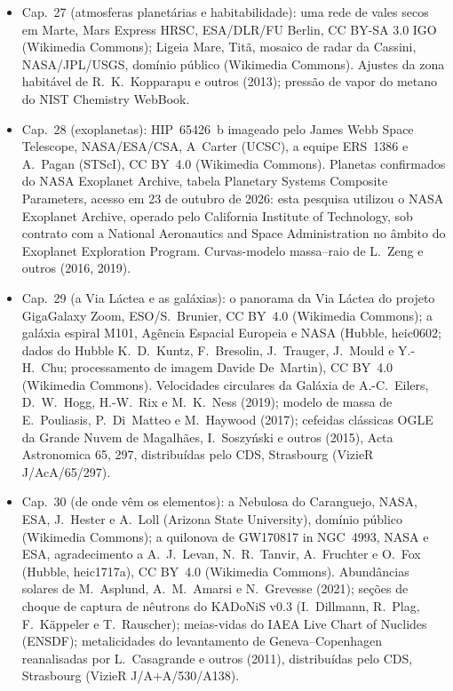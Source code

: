 \begin{itemize}
  \item Cap.~27 (atmosferas planetárias e habitabilidade): uma rede de vales secos em Marte, Mars Express HRSC, ESA/DLR/FU Berlin, CC BY-SA 3.0 IGO (Wikimedia Commons); Ligeia Mare, Titã, mosaico de radar da Cassini, NASA/JPL/USGS, domínio público (Wikimedia Commons). Ajustes da zona habitável de R.~K.~Kopparapu e outros (2013); pressão de vapor do metano do NIST Chemistry WebBook.
  \item Cap.~28 (exoplanetas): HIP~65426~b imageado pelo James Webb Space Telescope, NASA/ESA/CSA, A~Carter (UCSC), a equipe ERS~1386 e A.~Pagan (STScI), CC BY~4.0 (Wikimedia Commons). Planetas confirmados do NASA Exoplanet Archive, tabela Planetary Systems Composite Parameters, acesso em 23 de outubro de 2026: esta pesquisa utilizou o NASA Exoplanet Archive, operado pelo California Institute of Technology, sob contrato com a National Aeronautics and Space Administration no âmbito do Exoplanet Exploration Program. Curvas-modelo massa--raio de L.~Zeng e outros (2016, 2019).
  \item Cap.~29 (a Via Láctea e as galáxias): o panorama da Via Láctea do projeto GigaGalaxy Zoom, ESO/S.~Brunier, CC BY~4.0 (Wikimedia Commons); a galáxia espiral M101, Agência Espacial Europeia e NASA (Hubble, heic0602; dados do Hubble K.~D.~Kuntz, F.~Bresolin, J.~Trauger, J.~Mould e Y.-H.~Chu; processamento de imagem Davide De~Martin), CC BY~4.0 (Wikimedia Commons). Velocidades circulares da Galáxia de A.-C.~Eilers, D.~W.~Hogg, H.-W.~Rix e M.~K.~Ness (2019); modelo de massa de E.~Pouliasis, P.~Di~Matteo e M.~Haywood (2017); cefeidas clássicas OGLE da Grande Nuvem de Magalhães, I.~Soszy\'nski e outros (2015), Acta Astronomica 65, 297, distribuídas pelo CDS, Strasbourg (VizieR J/AcA/65/297).
  \item Cap.~30 (de onde vêm os elementos): a Nebulosa do Caranguejo, NASA, ESA, J.~Hester e A.~Loll (Arizona State University), domínio público (Wikimedia Commons); a quilonova de GW170817 in NGC~4993, NASA e ESA, agradecimento a A.~J.~Levan, N.~R.~Tanvir, A.~Fruchter e O.~Fox (Hubble, heic1717a), CC BY~4.0 (Wikimedia Commons). Abundâncias solares de M.~Asplund, A.~M.~Amarsi e N.~Grevesse (2021); seções de choque de captura de nêutrons do KADoNiS v0.3 (I.~Dillmann, R.~Plag, F.~K\"appeler e T.~Rauscher); meias-vidas do IAEA Live Chart of Nuclides (ENSDF); metalicidades do levantamento de Geneva--Copenhagen reanalisadas por L.~Casagrande e outros (2011), distribuídas pelo CDS, Strasbourg (VizieR J/A+A/530/A138).
\end{itemize}
